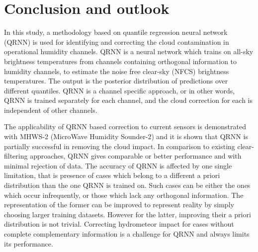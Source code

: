 \documentclass[amt, manuscript]{copernicus}
\begin{document}
\section{Conclusion and outlook}  %
\label{conclusions}
%

In this study, a methodology based on quantile regression neural network (QRNN) is used for identifying and correcting the cloud contamination in operational humidity channels. QRNN is a neural network which trains on all-sky brightness temperatures from  channels containing orthogonal information to humidity channels, to estimate the noise free clear-sky (NFCS) brightness temperatures. The output is the posterior distribution of predictions over different quantiles. QRNN is a channel specific approach, or in other words, QRNN is trained separately for each channel, and the cloud correction for each is independent of other channels. 

The applicability of QRNN based correction to current sensors is demonstrated with MHWS-2 (MicroWave Humidity Sounder-2) and it is shown that QRNN is partially successful in removing the cloud impact. In comparison to existing clear-filtering approaches, QRNN gives comparable or better performance and with minimal rejection of data. The accuracy of QRNN is affected by one single limitation, that is presence of cases which belong to a different a priori distribution than the one QRNN is trained on. Such cases can be either the ones which occur infrequently, or those which lack any orthogonal information. The representation of the former can be improved to represent reality by simply choosing larger training datasets. However for the latter, improving their a priori distribution is not trivial. Correcting hydrometeor impact for cases without complete complementary information is a challenge for QRNN and always limits its performance.
\end{document}
